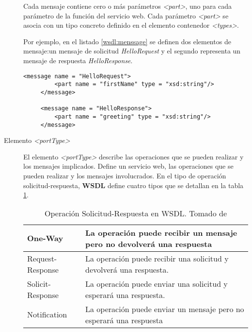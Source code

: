 \begin{description}
 	Cada mensaje contiene cero o más parámetros \textit{<part>}, uno para cada parámetro de la función del servicio web. 	
 	Cada parámetro \textit{<part>} se asocia con un tipo concreto definido en el elemento contenedor \textit{<types>}.
 	
    Por ejemplo, en el listado \ref{wsdl:menssage}  se definen dos elementos de mensaje:un mensaje de solicitud \textit{HelloRequest} y el segundo representa un mensaje de respuesta  \textit{HelloResponse}.	
 	
 	\begin{lstlisting}[label=wsdl:menssage, caption=Descripci\'on del elemento <message>. Tomado de \WC]
 	 <message name = "HelloRequest">
 		 <part name = "firstName" type = "xsd:string"/>
 	 </message>
 	 
 	 <message name = "HelloResponse">
 		 <part name = "greeting" type = "xsd:string"/>
 	 </message>
 	\end{lstlisting}
 	
 	
 	\item [Elemento \textit{<portType>}] El elemento  \textit{<portType>} describe las operaciones que se pueden realizar y los mensajes implicados.  Define un servicio web, las operaciones que se pueden realizar y los mensajes involucrados.  	
 	En el  tipo de operación solicitud-respuesta, \textbf{WSDL} define cuatro tipos que se  detallan en la tabla \ref{tab:wsdl-oper-sol-resp}.
 	
 	\begin{table}[h]
 		\footnotesize%
 		\begin{center}
 			\footnotesize
 			\begin{tabular}{p{}p{}}
 				\hline
 				\quad  One-Way  & La operación puede recibir un mensaje pero no devolverá una respuesta \\ 	
 				\hline
 				\quad Request-Response & La operación puede recibir una solicitud y devolverá una respuesta. \\
 				\hline
 				\quad Solicit-Response & La operación puede enviar una solicitud y esperará una respuesta.  \\
 				\hline
 				\quad Notification & La operación puede enviar un mensaje pero no esperará una respuesta  \\
 				\hline
 				
 			\end{tabular}
 		\end{center}
 		\caption{Operaci\'on Solicitud-Respuesta en WSDL. Tomado de \cite{W3C2022} }
 		\label{tab:wsdl-oper-sol-resp}
 	\end{table}
 	

\end{description}
